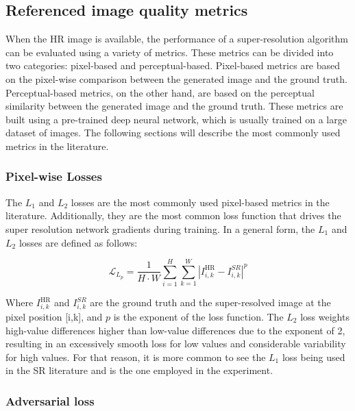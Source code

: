     \subsection{Referenced image quality metrics}

        When the HR image is available, the performance of a super-resolution algorithm can be evaluated using a variety of metrics. 
        These metrics can be divided into two categories: pixel-based and perceptual-based.
        Pixel-based metrics are based on the pixel-wise comparison between the generated image and the ground truth. 
        Perceptual-based metrics, on the other hand, are based on the perceptual similarity between the generated image and the ground truth. 
        These metrics are built using a pre-trained deep neural network, which is usually trained on a large dataset of images.
        The following sections will describe the most commonly used metrics in the literature.

        \subsubsection{Pixel-wise Losses}

            The $L_1$ and $L_2$ losses are the most commonly used pixel-based metrics in the literature. 
            Additionally, they are the most common loss function that drives the super resolution network gradients during training. 
            In a general form, the $L_1$ and $L_2$ losses are defined as follows:

            \begin{equation}
                \mathcal{L}_{L_p} = \frac{1}{H \cdot W} \sum_{i=1}^{H} \sum_{k=1}^{W} |I^{\text{HR}}_{i,k} - I^{SR}_{i,k}|^p
            \end{equation}

            Where $I^{\text{HR}}_{i,k}$ and $I^{SR}_{i,k}$ are the ground truth and the super-resolved image at the pixel position [i,k], and $p$ is the exponent of the loss function. 
            The $L_2$ loss weights high-value differences higher than low-value differences due to the exponent of 2, resulting in an excessively smooth loss for low values and considerable variability for high values.
            For that reason, it is more common to see the $L_1$ loss being used in the SR literature and is the one employed in the experiment.

        \subsubsection{Adversarial loss}

